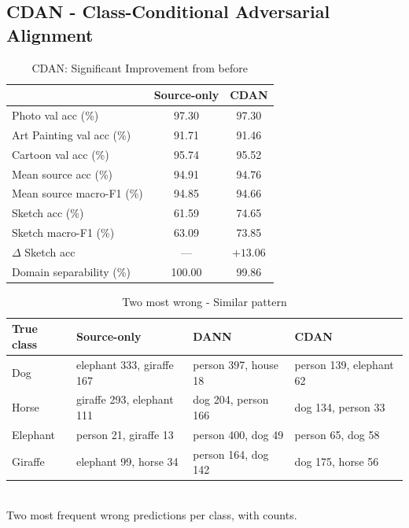 \documentclass{article}
\begin{document}
\subsection{CDAN - Class-Conditional Adversarial Alignment}

\begin{table}[H]
  \caption{CDAN: Significant Improvement from before}
  \label{tab:cdan}
  \centering
  \begin{tabular}{lcc}
    \toprule
    & Source-only & CDAN \\
    \midrule
    Photo val acc (\%)          & 97.30 & 97.30 \\
    Art Painting val acc (\%)   & 91.71 & 91.46 \\
    Cartoon val acc (\%)        & 95.74 & 95.52 \\
    \midrule
    Mean source acc (\%)        & 94.91 & 94.76 \\
    Mean source macro-F1 (\%)   & 94.85 & 94.66 \\
    \midrule
    Sketch acc (\%)             & 61.59 & 74.65 \\
    Sketch macro-F1 (\%)        & 63.09 & 73.85 \\
    $\Delta$ Sketch acc         & ---   & $+13.06$ \\
    Domain separability (\%)    & 100.00 & 99.86 \\
    \bottomrule
  \end{tabular}
\end{table}

\begin{table}[H]
  \caption{Two most wrong - Similar pattern}
  \label{tab:t2-confusions}
  \centering
  \footnotesize
  \begin{tabular}{llll}
    \toprule
    True class & Source-only & DANN & CDAN \\
    \midrule
    Dog      & elephant 333, giraffe 167 & person 397, house 18 & person 139, elephant 62 \\
    Horse    & giraffe 293, elephant 111 & dog 204, person 166  & dog 134, person 33 \\
    Elephant & person 21, giraffe 13     & person 400, dog 49   & person 65, dog 58 \\
    Giraffe  & elephant 99, horse 34     & person 164, dog 142  & dog 175, horse 56 \\
    \bottomrule
  \end{tabular}
  \\[2pt]
  \footnotesize Two most frequent wrong predictions per class, with counts.
\end{table}
\end{document}
